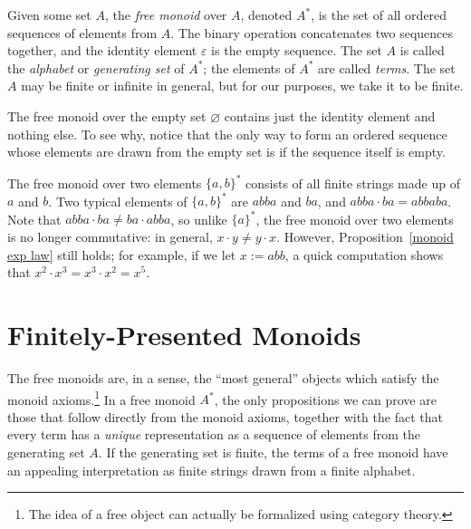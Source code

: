 \documentclass[../generics]{subfiles}
\begin{document}
\begin{definition}
%
%
%
%
Given some set $A$, the \emph{free monoid} over $A$, denoted $A^*$, is the set of all ordered sequences of elements from $A$. The binary operation concatenates two sequences together, and the identity element $\varepsilon$ is the empty sequence. The set $A$ is called the \emph{alphabet} or \emph{generating set} of $A^*$; the elements of $A^*$ are called \emph{terms}. The set $A$ may be finite or infinite in general, but for our purposes, we take it to be finite.
\end{definition}
\begin{example}
%
%
%
The free monoid over the empty set $\varnothing$ contains just the identity element and nothing else. To see why, notice that the only way to form an ordered sequence whose elements are drawn from the empty set is if the sequence itself is empty.
\end{example}
\begin{example}
%
The free monoid over two elements $\{a,b\}^*$ consists of all finite strings made up of $a$ and $b$. Two typical elements of $\{a,b\}^*$ are $abba$ and $ba$, and $abba\cdot ba=abbaba$. Note that $abba\cdot ba\neq ba\cdot abba$, so unlike $\{a\}^*$, the free monoid over two elements is no longer commutative: in general, $x\cdot y \neq y \cdot x$. However, Proposition~\ref{monoid exp law} still holds; for example, if we let $x:=abb$, a quick computation shows that $x^2\cdot x^3=x^3\cdot x^2=x^5$.
\end{example}

\section{Finitely-Presented Monoids}\label{finitely presented monoids}

The free monoids are, in a sense, the ``most general'' objects which satisfy the monoid axioms.\footnote{The idea of a free object can actually be formalized using category theory.} In a free monoid $A^*$, the only propositions we can prove are those that follow directly from the monoid axioms, together with the fact that every term has a \emph{unique} representation as a sequence of elements from the generating set $A$. If the generating set is finite, the terms of a free monoid have an appealing interpretation as finite strings drawn from a finite alphabet.
\end{document}
